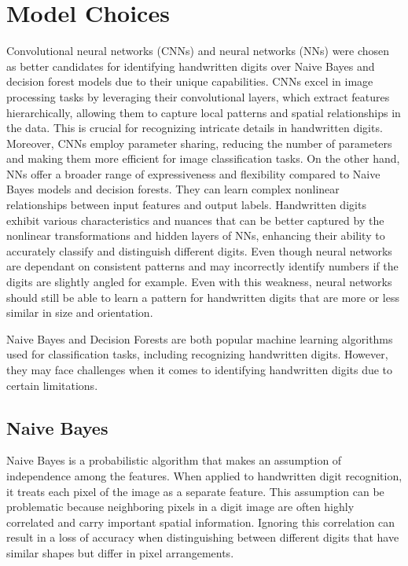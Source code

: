 \documentclass[a4paper,twoside,10pt]{article}
\begin{document}
\section{Model Choices}
\label{sec:model_choice}
Convolutional neural networks (CNNs) and neural networks (NNs) were chosen as better candidates for identifying handwritten digits over Naive Bayes and decision forest models due to their unique capabilities. CNNs excel in image processing tasks by leveraging their convolutional layers, which extract features hierarchically, allowing them to capture local patterns and spatial relationships in the data. This is crucial for recognizing intricate details in handwritten digits. Moreover, CNNs employ parameter sharing, reducing the number of parameters and making them more efficient for image classification tasks. On the other hand, NNs offer a broader range of expressiveness and flexibility compared to Naive Bayes models and decision forests. They can learn complex nonlinear relationships between input features and output labels. Handwritten digits exhibit various characteristics and nuances that can be better captured by the nonlinear transformations and hidden layers of NNs, enhancing their ability to accurately classify and distinguish different digits. Even though neural networks are dependant on consistent patterns and may incorrectly identify numbers if the digits are slightly angled for example. Even with this weakness, neural networks should still be able to learn a pattern for handwritten digits that are more or less similar in size and orientation.

Naive Bayes and Decision Forests are both popular machine learning algorithms used for classification tasks, including recognizing handwritten digits. However, they may face challenges when it comes to identifying handwritten digits due to certain limitations.

\subsection{Naive Bayes}
Naive Bayes is a probabilistic algorithm that makes an assumption of independence among the features. When applied to handwritten digit recognition, it treats each pixel of the image as a separate feature. This assumption can be problematic because neighboring pixels in a digit image are often highly correlated and carry important spatial information. Ignoring this correlation can result in a loss of accuracy when distinguishing between different digits that have similar shapes but differ in pixel arrangements.
\end{document}
